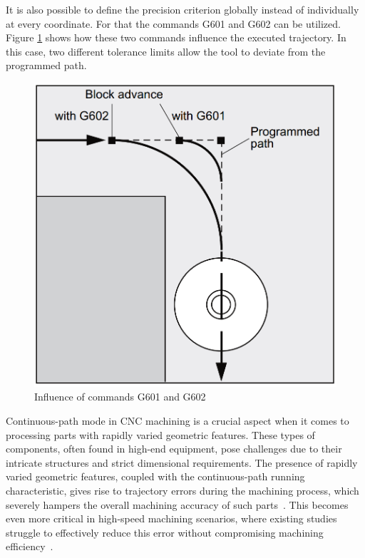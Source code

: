 It is also possible to define the precision criterion globally instead of individually at every coordinate. For that the commands G601 and G602 can be utilized. Figure \ref{C4} shows how these two commands influence the executed trajectory. In this case, two different tolerance limits allow the tool to deviate from the programmed path.
 
\begin{figure}[H]
 	\centerline{\includegraphics[scale=.25]{figures/conti3.png}}
 	\caption{Influence of commands G601 and G602~\cite{sinumericmanual}}
 	\label{C4}
\end{figure}
 
 
 
Continuous-path mode in CNC machining is a crucial aspect when it comes to processing parts with rapidly varied geometric features. These types of components, often found in high-end equipment, pose challenges due to their intricate structures and strict dimensional requirements. The presence of rapidly varied geometric features, coupled with the continuous-path running characteristic, gives rise to trajectory errors during the machining process, which severely hampers the overall machining accuracy of such parts~\cite{Shahzadeh.2018}. This becomes even more critical in high-speed machining scenarios, where existing studies struggle to effectively reduce this error without compromising machining efficiency~\cite{Li.2018}.

